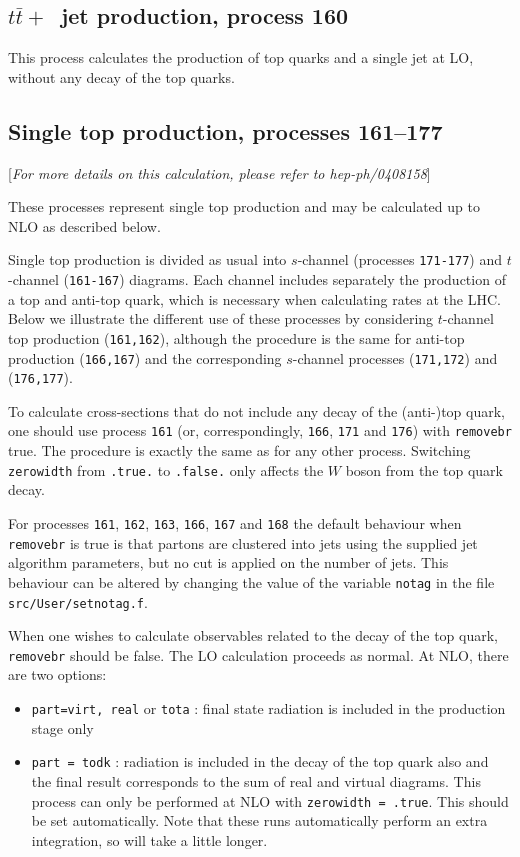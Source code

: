 \documentclass[12pt]{article}
\begin{document}
\subsection{$t{\bar t}+$~jet production, process 160}
This process calculates the production of top quarks and a single jet
at LO, without any decay of the top quarks.

\subsection{Single top production, processes 161--177}
\label{subsec:stop}

\begin{center}
[{\it For more details on this calculation, please refer to hep-ph/0408158}]
\end{center}

These processes represent single top production and may be calculated up to
NLO as described below.

Single top production is divided as usual into $s$-channel 
(processes {\tt 171-177}) and $t$-channel ({\tt 161-167})
diagrams. Each channel includes separately the production of a top
and anti-top quark, which is necessary when calculating rates at the LHC.
Below we illustrate the different use of these processes by considering
$t$-channel top production ({\tt 161,162}), although the procedure is the same
for anti-top production ({\tt 166,167}) and the corresponding $s$-channel
processes ({\tt 171,172}) and ({\tt 176,177}).


To calculate cross-sections that do not include any decay of the (anti-)top
quark, one should use process {\tt 161}
(or, correspondingly, {\tt 166}, {\tt 171} and {\tt 176}) with {\tt removebr}
true. The procedure is exactly the same
as for any other process.
Switching {\tt zerowidth} from {\tt .true.} to {\tt .false.} only affects
the $W$ boson from the top quark decay.

For processes {\tt 161}, {\tt 162}, {\tt 163}, {\tt 166}, {\tt 167}
and {\tt 168} the default behaviour when {\tt removebr} is true is that
partons are clustered into jets using the supplied jet
algorithm parameters, but no cut is applied on the number of jets.
This behaviour can be altered by changing the value of the
variable {\tt notag} in the file {\tt src/User/setnotag.f}.
 
When one wishes to calculate observables related to the decay of the top
quark, {\tt removebr} should be false.
The LO calculation proceeds as normal. At NLO, there are two options:
\begin{itemize}
\item {\tt part=virt, real} or {\tt tota} : final state radiation is included
in the production stage only
\item {\tt part = todk} : radiation is included in the decay of the top
quark also and the final result corresponds to the sum of real and virtual
diagrams. This process can only be performed at NLO with 
{\tt zerowidth = .true}. This should be set automatically.
Note that these runs automatically perform an extra integration, so
will take a little longer.
\end{itemize}
\end{document}
